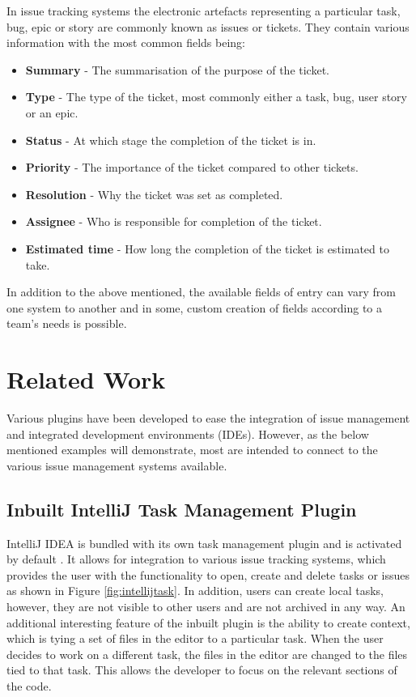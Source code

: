 \documentclass{4thYearProject}
\begin{document}
In issue tracking systems the electronic artefacts representing a particular task, bug, epic or story are commonly known as issues or tickets. They contain various information with the most common fields being:

\begin{itemize}
\item \textbf{Summary} - The summarisation of the purpose of the ticket.
\item \textbf{Type} - The type of the ticket, most commonly either a task, bug, user story or an epic. 
\item \textbf{Status} - At which stage the completion of the ticket is in.
\item \textbf{Priority} - The importance of the ticket compared to other tickets.
\item \textbf{Resolution} - Why the ticket was set as completed.
\item \textbf{Assignee} - Who is responsible for completion of the ticket.
\item \textbf{Estimated time} - How long the completion of the ticket is estimated to take.
\end{itemize}

In addition to the above mentioned, the available fields of entry can vary from one system to another and in some, custom creation of fields according to a team's needs is possible. 

\section{Related Work}

Various plugins have been developed to ease the integration of issue management and integrated development environments (IDEs). However, as the below mentioned examples will demonstrate, most are intended to connect to the various issue management systems available. 

\subsection{Inbuilt IntelliJ Task Management Plugin}

IntelliJ IDEA is bundled with its own task management plugin and is activated by default \cite{intellijtaskplugin}. It allows for integration to various issue tracking systems, which provides the user with the functionality to open, create and delete tasks or issues as shown in Figure \ref{fig:intellijtask}. In addition, users can create local tasks, however, they are not visible to other users and are not archived in any way. An additional interesting feature of the inbuilt plugin is the ability to create context, which is tying a set of files in the editor to a particular task. When the user decides to work on a different task, the files in the editor are changed to the files tied to that task. This allows the developer to focus on the relevant sections of the code.   
\end{document}
